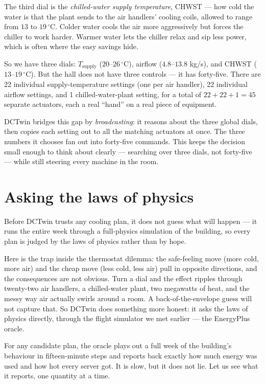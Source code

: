 \documentclass[11pt]{report}
\begin{document}
The third dial is the \emph{chilled-water supply temperature}, CHWST --- how cold the water is that the plant sends to the air handlers' cooling coils, allowed to range from $13$ to $19\,^\circ$C. Colder water cools the air more aggressively but forces the chiller to work harder. Warmer water lets the chiller relax and sip less power, which is often where the easy savings hide.

So we have three dials: $T_{\text{supply}}$ ($20$--$26\,^\circ$C), airflow ($4.8$--$13.8$ kg/s), and CHWST ($13$--$19\,^\circ$C). But the hall does not have three controls --- it has forty-five. There are 22 individual supply-temperature settings (one per air handler), 22 individual airflow settings, and 1 chilled-water-plant setting, for a total of $22 + 22 + 1 = 45$ separate actuators, each a real ``hand'' on a real piece of equipment.

DCTwin bridges this gap by \emph{broadcasting}: it reasons about the three global dials, then copies each setting out to all the matching actuators at once. The three numbers it chooses fan out into forty-five commands. This keeps the decision small enough to think about clearly --- searching over three dials, not forty-five --- while still steering every machine in the room.

\section{Asking the laws of physics}
\label{sec:oracle}

\begin{keyidea}
Before DCTwin trusts any cooling plan, it does not guess what will happen --- it runs the entire week through a full-physics simulation of the building, so every plan is judged by the laws of physics rather than by hope.
\end{keyidea}

Here is the trap inside the thermostat dilemma: the safe-feeling move (more cold, more air) and the cheap move (less cold, less air) pull in opposite directions, and the consequences are not obvious. Turn a dial and the effect ripples through twenty-two air handlers, a chilled-water plant, two megawatts of heat, and the messy way air actually swirls around a room. A back-of-the-envelope guess will not capture that. So DCTwin does something more honest: it asks the laws of physics directly, through the flight simulator we met earlier --- the EnergyPlus oracle.

For any candidate plan, the oracle plays out a full week of the building's behaviour in fifteen-minute steps and reports back exactly how much energy was used and how hot every server got. It is slow, but it does not lie. Let us see what it reports, one quantity at a time.
\end{document}
